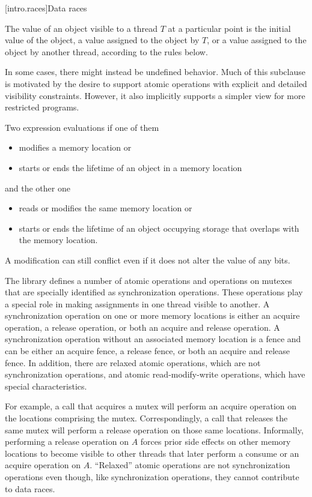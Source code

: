 [intro.races]{Data races}

\pnum
The value of an object visible to a thread $T$ at a particular point is the
initial value of the object, a value assigned to the object by $T$, or a
value assigned to the object by another thread, according to the rules below.
\begin{note}
In some cases, there might instead be undefined behavior. Much of this
subclause is motivated by the desire to support atomic operations with explicit
and detailed visibility constraints. However, it also implicitly supports a
simpler view for more restricted programs.
\end{note}

\pnum
Two expression evaluations  if one of them
\begin{itemize}
\item
modifies a memory location or
\item
starts or ends the lifetime of an object in a memory location
\end{itemize}
and the other one
\begin{itemize}
\item
reads or modifies the same memory location or
\item
starts or ends the lifetime of an object occupying storage that
overlaps with the memory location.
\end{itemize}
\begin{note}
A modification can still conflict
even if it does not alter the value of any bits.
\end{note}

\pnum
The library defines a number of atomic operations and
operations on mutexes that are specially identified as
synchronization operations. These operations play a special role in making
assignments in one thread visible to another. A synchronization operation on one
or more memory locations is either an acquire operation, a
release operation, or both an acquire and release operation. A synchronization
operation without an associated memory location is a fence and can be either an
acquire fence, a release fence, or both an acquire and release fence. In
addition, there are relaxed atomic operations, which are not synchronization
operations, and atomic read-modify-write operations, which have special
characteristics.
\begin{note}
For example, a call that acquires a mutex will
perform an acquire operation on the locations comprising the mutex.
Correspondingly, a call that releases the same mutex will perform a release
operation on those same locations. Informally, performing a release operation on
$A$ forces prior
%
side effects on other memory locations to become visible
to other threads that later perform a consume or an acquire operation on
$A$. ``Relaxed'' atomic operations are not synchronization operations even
though, like synchronization operations, they cannot contribute to data races.
\end{note}

